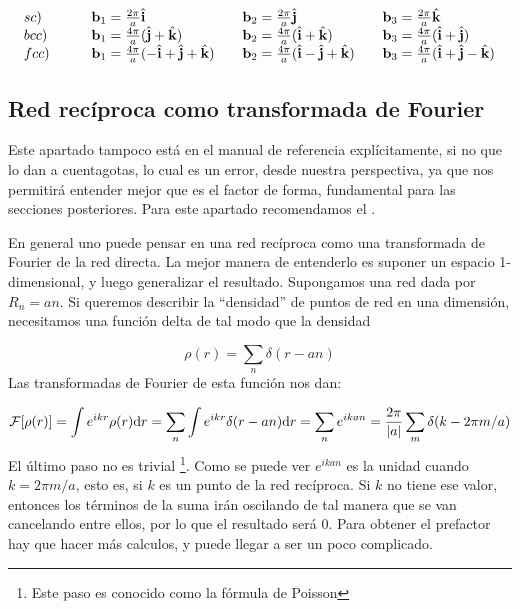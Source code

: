\begin{equation*}
	\begin{array}{llll} 
		sc) \quad &  \quad \mathbf{b}_1 = \frac{2\pi}{a} \hat{\mathbf{i}} & \quad \mathbf{b}_2 = \frac{2\pi}{a} \hat{\mathbf{j}} & \quad \mathbf{b}_3 = \frac{2\pi}{a} \hat{\mathbf{k}} \\
		bcc) \quad & \quad \mathbf{b}_1 = \frac{4\pi}{a} (\hat{\mathbf{j}} + \hat{\mathbf{k}}) & \quad \mathbf{b}_2 = \frac{4\pi}{a} (\hat{\mathbf{i}} + \hat{\mathbf{k}}) & \quad \mathbf{b}_3 = \frac{4\pi}{a} (\hat{\mathbf{i}} + \hat{\mathbf{j}}) \\
		fcc)  \quad & \quad \mathbf{b}_1 =\frac{4\pi}{a}(-\hat{\mathbf{i}}+\hat{\mathbf{j}}+\hat{\mathbf{k}}) & \quad \mathbf{b}_2 = \frac{4\pi}{a} (\hat{\mathbf{i}}-\hat{\mathbf{j}}+\hat{\mathbf{k}})  & \quad \mathbf{b}_3 = \frac{4\pi}{a} (\hat{\mathbf{i}}+\hat{\mathbf{j}}-\hat{\mathbf{k}})  \\
	\end{array}
\end{equation*}

\subsection{Red recíproca como transformada de Fourier}

Este apartado tampoco está en el manual de referencia \cite{Fisica_del_Estado_Solido} explícitamente, si no que lo dan a cuentagotas, lo cual es un error, desde nuestra perspectiva, ya que nos permitirá entender mejor que es el factor de forma, fundamental para las secciones posteriores. Para este apartado recomendamos el \cite{Oxford_Solid_State}.

En general uno puede pensar en una red recíproca como una transformada de Fourier de la red directa. La mejor manera de entenderlo es suponer un espacio 1-dimensional, y luego generalizar el resultado. Supongamos una red dada por $R_n=an$. Si queremos describir la ``densidad'' de puntos de red en una dimensión, necesitamos una función delta de tal modo que la densidad

\begin{equation}
	\rho (r) = \sum_n \delta (r-an) 
\end{equation}
Las transformadas de Fourier de esta función nos dan:

\begin{equation}
	\mathcal{F} [\rho(r)] = \int e^{ikr} \rho (r) \mathrm{d} r =  \sum_{n} \int e^{ikr} \delta (r-an) \mathrm{d} r =  \sum_n e^{ikan} = \frac{2\pi}{|a|} \sum_m \delta (k - 2\pi m/a)
\end{equation}
El último paso no es trivial \footnote{Este paso es conocido como la fórmula de Poisson}. Como se puede ver $e^{ikan}$ es la unidad cuando $k=2\pi m/a$, esto es, si $k$ es un punto de la red recíproca. Si $k$ no tiene ese valor, entonces los términos de la suma irán oscilando de tal manera que se van cancelando entre ellos, por lo que el resultado será 0. Para obtener el prefactor hay que hacer más calculos, y puede llegar a ser un poco complicado.

